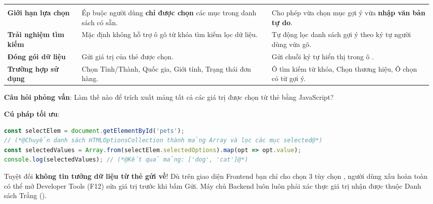 \begin{prettyTableBox}
\small
{}
\begin{tabularx}{\linewidth}{K{2.8cm} Z Z}
 &  &  \\
\textbf{Giới hạn lựa chọn} & Ép buộc người dùng \textbf{chỉ được chọn} các mục trong danh sách có sẵn. & Cho phép vừa chọn mục gợi ý vừa \textbf{nhập văn bản tự do}. \\
\textbf{Trải nghiệm tìm kiếm} & Mặc định không hỗ trợ ô gõ từ khóa tìm kiếm lọc dữ liệu. & Tự động lọc danh sách gợi ý theo ký tự người dùng vừa gõ. \\
\textbf{Đóng gói dữ liệu} & Gửi giá trị  của thẻ  được chọn. & Gửi chuỗi ký tự hiển thị trong ô . \\
\textbf{Trường hợp sử dụng} & Chọn Tỉnh/Thành, Quốc gia, Giới tính, Trạng thái đơn hàng. & Ô tìm kiếm từ khóa, Chọn thương hiệu, Ô chọn có từ gợi ý. \\
\end{tabularx}
\end{prettyTableBox}

\begin{tipBox}
\textbf{Câu hỏi phỏng vấn}: Làm thế nào để trích xuất mảng tất cả các giá trị được chọn từ thẻ  bằng JavaScript?
\par\vspace{4pt}
\textbf{Cú pháp tối ưu}:
\begin{codeWindow}
\begin{lstlisting}[language=JavaScript]
const selectElem = document.getElementById('pets');
// (*@Chuyển danh sách HTMLOptionsCollection thành mảng Array và lọc các mục selected@*)
const selectedValues = Array.from(selectElem.selectedOptions).map(opt => opt.value);
console.log(selectedValues); // (*@Kết quả mảng: ['dog', 'cat']@*)
\end{lstlisting}
\end{codeWindow}
\end{tipBox}

\begin{warnBox}
Tuyệt đối \textbf{không tin tưởng dữ liệu từ thẻ  gửi về}! Dù trên giao diện Frontend bạn chỉ cho chọn 3 tùy chọn \codeinline{["vn", "us", "jp"]}, người dùng xấu hoàn toàn có thể mở Developer Tools (F12) sửa giá trị  trước khi bấm Gửi. Máy chủ Backend luôn luôn phải xác thực giá trị nhận được thuộc Danh sách Trắng ().
\end{warnBox}

